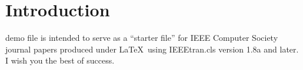 \documentclass[10pt,journal,compsoc]{IEEEtran}
\begin{document}
%
\IEEEpeerreviewmaketitle


\ifCLASSOPTIONcompsoc
{}
\else
\section{Introduction}
\label{sec:introduction}
\fi




% 
% 
% 
% 
 demo file is intended to serve as a ``starter file''
for IEEE Computer Society journal papers produced under \LaTeX\ using
IEEEtran.cls version 1.8a and later.
I wish you the best of success.
\end{document}
